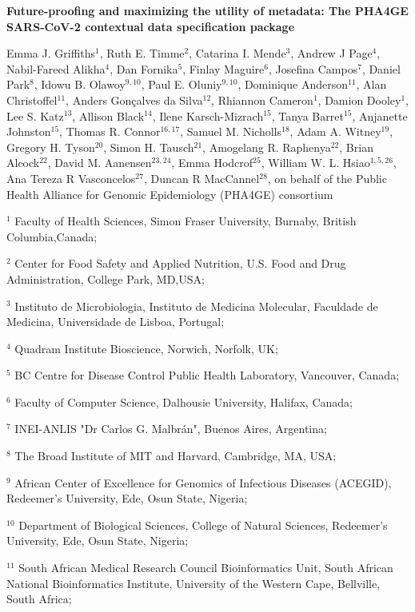 \cleardoublepage 

\begin{center}
\large
\textbf{Future-proofing and maximizing the utility of metadata: The PHA4GE SARS-CoV-2 contextual data specification package}
\end{center}

Emma J. Griffiths$^1$, 
Ruth E. Timme$^2$,
Catarina I. Mende$^3$,
Andrew J Page$^4$,
Nabil-Fareed Alikha$^4$,
Dan Fornika$^5$,
Finlay Maguire$^6$,
Josefina Campos$^7$,
Daniel Park$^8$,
Idowu B. Olawoy$^{9,10}$,
Paul E. Oluniy$^{9,10}$,
Dominique Anderson$^{11}$,
Alan Christoffel$^{11}$,
Anders Gonçalves da Silva$^{12}$,
Rhiannon Cameron$^1$,
Damion Dooley$^1$,
Lee S. Katz$^{13}$,
Allison Black$^{14}$,
Ilene Karsch-Mizrach$^{15}$,
Tanya Barret$^{15}$,
Anjanette Johnston$^{15}$,
Thomas R. Connor$^{16,17}$,
Samuel M. Nicholls$^{18}$,
Adam A. Witney$^{19}$,
Gregory H. Tyson$^{20}$,
Simon H. Tausch$^{21}$,
Amogelang R. Raphenya$^{22}$,
Brian Alcock$^{22}$,
David M. Aanensen$^{23,24}$,
Emma Hodcrof$^{25}$,
William W. L. Hsiao$^{1,5,26}$,
Ana Tereza R Vasconcelos$^{27}$,
Duncan R MacCannel$^{28}$,
on behalf of the Public Health Alliance for Genomic Epidemiology (PHA4GE) consortium

$^1$  Faculty of Health Sciences, Simon Fraser University, Burnaby, British Columbia,Canada;

$^2$ Center for Food Safety and Applied Nutrition, U.S. Food and Drug Administration, College Park, MD,USA; 

$^3$ Instituto de Microbiologia, Instituto de Medicina Molecular, Faculdade de Medicina, Universidade de Lisboa, Portugal;

$^4$ Quadram Institute Bioscience, Norwich, Norfolk, UK;

$^5$ BC Centre for Disease Control Public Health Laboratory, Vancouver, Canada;

$^6$ Faculty of Computer Science, Dalhousie University, Halifax, Canada;

$^7$ INEI-ANLIS "Dr Carlos G. Malbrán", Buenos Aires, Argentina;

$^8$ The Broad Institute of MIT and Harvard, Cambridge, MA, USA;

$^9$ African Center of Excellence for Genomics of Infectious Diseases (ACEGID), Redeemer's University, Ede, Osun State, Nigeria;

$^{10}$ Department of Biological Sciences, College of Natural Sciences, Redeemer's University, Ede, Osun State, Nigeria;

$^{11}$ South African Medical Research Council Bioinformatics Unit, South African National Bioinformatics Institute, University of the Western Cape, Bellville, South Africa;

